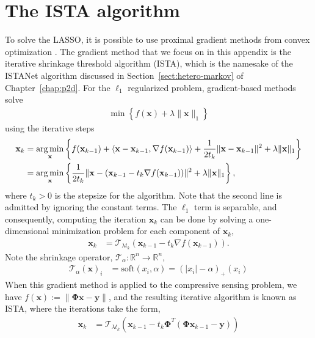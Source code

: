 \section{The ISTA algorithm}
To solve the LASSO, it is possible to use proximal gradient methods from convex optimization \cite{ref:beck2009fast}. The gradient method that we focus on in this appendix is the iterative shrinkage threshold algorithm (ISTA), which is the namesake of the ISTANet algorithm discussed in Section~\ref{sect:hetero-markov} of Chapter~\ref{chap:p2d}. For the $\ell_1$ regularized problem, gradient-based methods solve 
\begin{align*}
    \min \left\{f(\mathbf{x})+\lambda\|\mathbf{x}\|_1\right\}
\end{align*}
using the iterative steps
\begin{align*}
    \mathbf{x}_k &= \operatorname*{arg\,min}_{\mathbf{x}} \left\{f(\mathbf{x}_{k-1}) + \langle \mathbf{x} - \mathbf{x}_{k-1}, \nabla f(\mathbf{x}_{k-1}) \rangle + \frac{1}{2t_k}\|\mathbf{x} - \mathbf{x}_{k-1}\|^2 + \lambda\|\mathbf{x}\|_1\right\} \\
    &= \operatorname*{arg\,min}_{\mathbf{x}} \left\{\frac{1}{2t_k}\|\mathbf{x} - (\mathbf{x}_{k-1} - t_k\nabla f(\mathbf{x}_{k-1}))\|^2 + \lambda\|\mathbf{x}\|_1\right\},
\end{align*}
where $t_k>0$ is the stepsize for the algorithm. Note that the second line is admitted by ignoring the constant terms. The $\ell_1$ term is separable, and consequently, computing the iteration $\mathbf{x}_k$ can be done by solving a one-dimensional minimization problem for each component of $\mathbf{x}_k$,
\begin{align*}
    \mathbf{x}_k &= \mathcal{T}_{\lambda t_k} (\mathbf{x}_{k-1} - t_k\nabla f(\mathbf{x}_{k-1})).
\end{align*}
Note the shrinkage operator, $\mathcal{T}_{\alpha} : \mathbb{R}^n \to \mathbb{R}^n$,
\begin{align*}
    \mathcal{T}_{\alpha}(\mathbf{x})_i &= \text{soft}(x_i, \alpha) = (|x_i| - \alpha)_{+}(x_i)
\end{align*}
When this gradient method is applied to the compressive sensing problem, we have $f(\mathbf{x}) := \|\mathbf{\Phi}\mathbf{x}-\mathbf{y}\|$, and the resulting iterative algorithm is known as ISTA, where the iterations take the form,
\begin{align}
    \mathbf{x}_k &= \mathcal{T}_{\lambda t_k}(\mathbf{x}_{k-1} - t_k\mathbf{\Phi}^T(\mathbf{\Phi} \mathbf{x}_{k-1} - \mathbf{y}))
\end{align}
